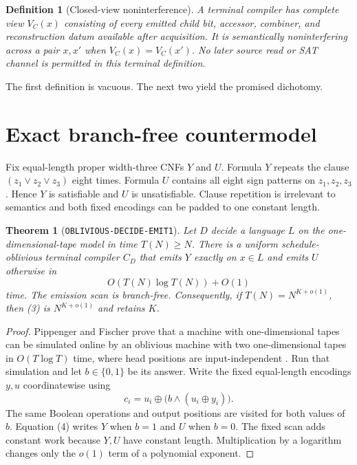 \documentclass[11pt]{article}
\newtheorem{definition}{Definition}
\newtheorem{theorem}{Theorem}
\begin{document}
\begin{definition}[Closed-view noninterference]
A terminal compiler has complete view $V_C(x)$ consisting of every emitted
child bit, accessor, combiner, and reconstruction datum available after
acquisition.  It is semantically noninterfering across a pair $x,x'$ when
$V_C(x)=V_C(x')$.  No later source read or SAT channel is permitted in this
terminal definition.
\end{definition}

The first definition is vacuous.  The next two yield the promised dichotomy.

\section{Exact branch-free countermodel}

Fix equal-length proper width-three CNFs $Y$ and $U$.  Formula $Y$ repeats the
clause $(z_1\vee z_2\vee z_3)$ eight times.  Formula $U$ contains all eight
sign patterns on $z_1,z_2,z_3$.  Hence $Y$ is satisfiable and $U$ is
unsatisfiable.  Clause repetition is irrelevant to semantics and both fixed
encodings can be padded to one constant length.

\begin{theorem}[\texttt{OBLIVIOUS-DECIDE-EMIT1}]
Let $D$ decide a language $L$ on the one-dimensional-tape model in time
$T(N)\ge N$.  There is a uniform schedule-oblivious terminal compiler $C_D$
that emits $Y$ exactly on $x\in L$ and emits $U$ otherwise in
\[
 O(T(N)\log T(N))+O(1)                                  \tag{3}
\]
time.  The emission scan is branch-free.  Consequently, if
$T(N)=N^{K+o(1)}$, then (3) is $N^{K+o(1)}$ and retains $K$.
\end{theorem}

\begin{proof}
Pippenger and Fischer prove that a machine with one-dimensional tapes can be
simulated online by an oblivious machine with two one-dimensional tapes in
$O(T\log T)$ time, where head positions are input-independent \cite{pf}.
Run that simulation and let $b\in\{0,1\}$ be its answer.  Write the fixed
equal-length encodings $y,u$ coordinatewise using
\[
 c_i=u_i\oplus\bigl(b\wedge(u_i\oplus y_i)\bigr).        \tag{4}
\]
The same Boolean operations and output positions are visited for both values
of $b$.  Equation (4) writes $Y$ when $b=1$ and $U$ when $b=0$.  The fixed
scan adds constant work because $Y,U$ have constant length.  Multiplication
by a logarithm changes only the $o(1)$ term of a polynomial exponent.
\end{proof}
\end{document}
